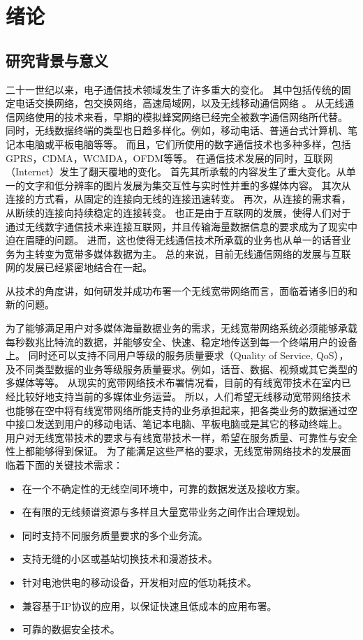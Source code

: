 \chapter{绪论}
\section{研究背景与意义}
二十一世纪以来，电子通信技术领域发生了许多重大的变化。
其中包括传统的固定电话交换网络，包交换网络，高速局域网，以及无线移动通信网络 \cite{LiShengLi2011}\cite{DingQi2010}。
从无线通信网络使用的技术来看，早期的模拟蜂窝网络已经完全被数字通信网络所代替。
同时，无线数据终端的类型也日趋多样化。例如，移动电话、普通台式计算机、笔记本电脑或平板电脑等等。
而且，它们所使用的数字通信技术也多种多样，包括GPRS，CDMA，WCMDA，OFDM等等。
在通信技术发展的同时，互联网（Internet）发生了翻天覆地的变化。
首先其所承载的内容发生了重大变化。从单一的文字和低分辨率的图片发展为集交互性与实时性并重的多媒体内容。
其次从连接的方式看，从固定的连接向无线的连接迅速转变。
再次，从连接的需求看，从断续的连接向持续稳定的连接转变。
也正是由于互联网的发展，使得人们对于通过无线数字通信技术来连接互联网，并且传输海量数据信息的要求成为了现实中迫在眉睫的问题。
进而，这也使得无线通信技术所承载的业务也从单一的话音业务为主转变为宽带多媒体数据为主。
总的来说，目前无线通信网络的发展与互联网的发展已经紧密地结合在一起。
\par 从技术的角度讲，如何研发并成功布署一个无线宽带网络而言，面临着诸多旧的和新的问题。
\par 为了能够满足用户对多媒体海量数据业务的需求，无线宽带网络系统必须能够承载每秒数兆比特流的数据，并能够安全、快速、稳定地传送到每一个终端用户的设备上。
同时还可以支持不同用户等级的服务质量要求（Quality of Service, QoS），及不同类型数据的业务等级服务质量要求。例如，话音、数据、视频或其它类型的多媒体等等。
从现实的宽带网络技术布署情况看，目前的有线宽带技术在室内已经比较好地支持当前的多媒体业务运营。
所以，人们希望无线移动宽带网络技术也能够在空中将有线宽带网络所能支持的业务承担起来，把各类业务的数据通过空中接口发送到用户的移动电话、笔记本电脑、平板电脑或是其它的移动终端上。
用户对无线宽带技术的要求与有线宽带技术一样，希望在服务质量、可靠性与安全性上都能够得到保证。
为了能满足这些严格的要求，无线宽带网络技术的发展面临着下面的关键技术需求：
\begin{itemize}
\item   在一个不确定性的无线空间环境中，可靠的数据发送及接收方案。
\item   在有限的无线频谱资源与多样且大量宽带业务之间作出合理规划。
\item   同时支持不同服务质量要求的多个业务流。
\item   支持无缝的小区或基站切换技术和漫游技术。
\item   针对电池供电的移动设备，开发相对应的低功耗技术。
\item   兼容基于IP协议的应用，以保证快速且低成本的应用布署。
\item   可靠的数据安全技术。
\end{itemize}

